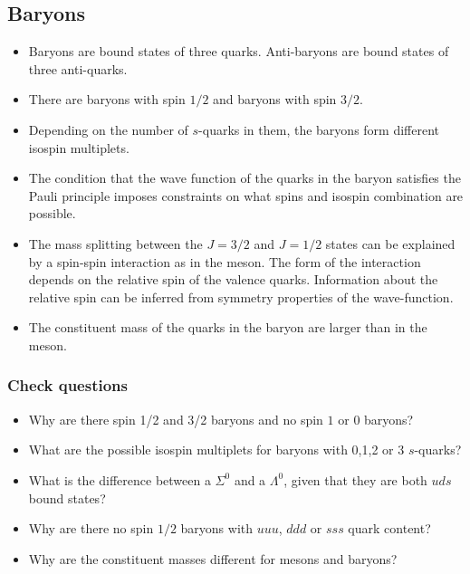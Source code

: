 \documentclass[12pt]{article}
\begin{document}
\subsection{Baryons}
\begin{itemize}
\item Baryons are bound states of three quarks. Anti-baryons are bound states of three anti-quarks.
\item There are baryons with spin $1/2$ and baryons with spin $3/2$.
\item  Depending on the number of $s$-quarks in them, the baryons form different isospin multiplets.
\item The condition that the wave function of the quarks in the baryon satisfies the Pauli principle imposes constraints on what spins and isospin combination are possible.
\item The mass splitting between the $J=3/2$ and $J=1/2$ states can be explained by a spin-spin interaction as in the meson. The form of the interaction depends on the relative spin of the valence quarks. Information about the relative spin can be inferred from symmetry properties of the wave-function.
  \item The constituent mass of the quarks in the baryon are larger than in the meson.
\end{itemize}
\subsubsection{Check questions}
\begin{itemize}
\item Why are there spin 1/2 and 3/2 baryons and no spin $1$ or $0$ baryons?
\item What are the possible isospin multiplets for baryons with 0,1,2 or 3 $s$-quarks?
  \item What is the difference between a $\Sigma^0$ and a $\Lambda^0$, given that they are both $uds$ bound states?
  \item Why are there no spin $1/2$ baryons with $uuu$, $ddd$ or $sss$ quark content?
    \item Why are the constituent masses different for mesons and baryons?
  \end{itemize}
\end{document}
